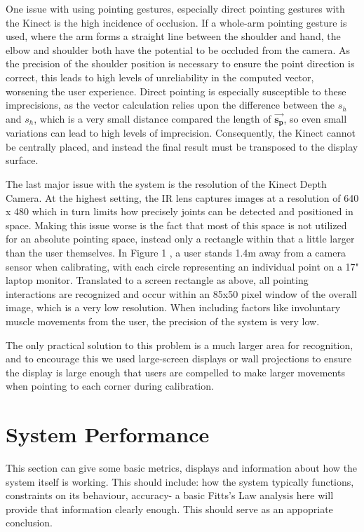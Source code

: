 One issue with using pointing gestures, especially direct pointing gestures with the Kinect is the high incidence of occlusion. If a whole-arm pointing gesture is used, where the arm forms a straight line between the shoulder and hand, the elbow and shoulder both have the potential to be occluded from the camera. As the precision of the shoulder position is necessary to ensure the point direction is correct, this leads to high levels of unreliability in the computed vector, worsening the user experience. Direct pointing is especially susceptible to these imprecisions, as the vector calculation relies upon the difference between the \(s_h\) and \(s_h\), which is a very small distance compared the length of \(\mathbf{\vec{s_p}}\), so even small variations can lead to high levels of imprecision. Consequently, the Kinect cannot be centrally placed, and instead the final result must be transposed to the display surface.

The last major issue with the system is the resolution of the Kinect Depth Camera. At the highest setting, the IR lens captures images at a resolution of 640 x 480 which in turn limits how precisely joints can be detected and positioned in space. Making this issue worse is the fact that most of this space is not utilized for an absolute pointing space, instead only a rectangle within that a little larger than the user themselves. In Figure 1 , a user stands 1.4m away from a camera sensor when calibrating, with each circle representing an individual point on a 17" laptop monitor. Translated to a screen rectangle as above, all pointing interactions are recognized and occur within an 85x50 pixel window of the overall image, which is a very low resolution. When including factors like involuntary muscle movements from the user, the precision of the system is very low.

The only practical solution to this problem is a much larger area for recognition, and to encourage this we used large-screen displays or wall projections to ensure the display is large enough that users are compelled to make larger movements when pointing to each corner during calibration.

\section{System Performance}

\begin{todoenv}

This section can give some basic metrics, displays and information about how the system itself is working. This should include: how the system typically functions, constraints on its behaviour, accuracy- a basic Fitts's Law analysis here will provide that information clearly enough. This should serve as an appopriate conclusion.

\end{todoenv}

